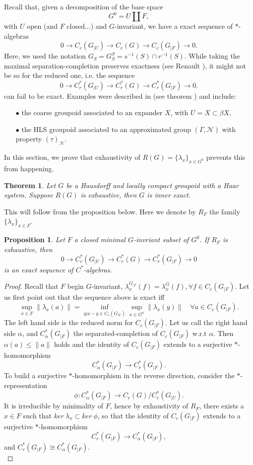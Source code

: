 \documentclass[a4paper]{amsart}
\newcommand\<{\langle}
\renewcommand\>{\rangle}
\newtheorem{thm}{Theorem}[section]
\newtheorem{proposition}[theorem]{Proposition}
\theoremstyle{definition}
\theoremstyle{remark}
\begin{document}
Recall that, given a decomposition of the base space 
\[G^0 = U \coprod F,\]
with $U$ open (and $F$ closed...) and $G$-invariant, we have a exact sequence of $*$-algebras
\[ 0 \rightarrow C_c(G_{|U})\rightarrow  C_c(G)\rightarrow  C_c(G_{|F})\rightarrow 0. \]
Here, we used the notation $G_{S} = G_S^S = s^{-1}(S)\cap r^{-1}(S)$. While taking the maximal separation-completion preserves exactness (see Renault \cite{}), it might not be so for the reduced one, i.e. the sequence 
\[ 0 \rightarrow C_r^*(G_{|U})\rightarrow  C_r^*(G)\rightarrow  C_r^*(G_{|F})\rightarrow 0. \]
can fail to be exact. Examples were described in \cite{DellAieraWillett} (see theorem ) and include:
\begin{itemize}
\item[$\bullet$] the coarse groupoid associated to an expander $X$, with $U=X \subset \beta X$,
\item[$\bullet$] the HLS groupoid associated to an approximated group $(\Gamma,\mathcal N)$ with property $(\tau)_{\mathcal N}$.
\end{itemize}

In this section, we prove that exhaustivity of $R(G)= \{\lambda_x\}_{x\in G^0} $ prevents this from happening.

\begin{thm}
Let $G$ be a Hausdorff and locally compact groupoid with a Haar system. Suppose $R(G)$ is exhaustive, then $G$ is inner exact.
\end{thm}

This will follow from the proposition below. Here we denote by $R_F$ the family $\{ \lambda_x \}_{x\in F}$.
\begin{proposition} Let $F$ a closed minimal $G$-invriant subset of $G^0$.
If $R_F$ is exhaustive, then \[ 0 \rightarrow C_r^*(G_{|U})\rightarrow  C_r^*(G)\rightarrow  C_r^*(G_{|F})\rightarrow 0 \]
is an exact sequence of $C^*$-algebras.
\end{proposition}

\begin{proof}
Recall that $F$ begin $G$-invariant, $\lambda^{G_{|F}}_x (f) =\lambda^G_x(f), \forall f \in C_c(G_{|F})$. Let us first point out that the sequence above is exact iff
\[ \sup_{x\in F} \|\lambda_x(a) \| = \inf_{y | a-y\in C_c(G_{|U})} \sup_{x\in G^0} \| \lambda_x(y)\| \quad \forall a \in C_c(G_{|F}).  \]
The left hand side is the reduced norm for $C_c(G_{|F})$. Let us call the right hand side $\alpha$, and $C^*_\alpha(G_{|F})$ the separated-completion of $C_c(G_{|F})$ w.r.t $\alpha$. Then $\alpha(a) \leq \| a \|$ holds and the identity of $C_c(G_{|F})$ extends to a surjective $*$-homomorphism
\[C^*_\alpha(G_{|F}) \rightarrow C^*_r(G_{|F}).\]
To build a surjective $*$-homomorphism in the reverse direction, consider the $*$-representation 
\[\phi: C_\alpha^*(G_{|F}) \rightarrow C_r(G) / C_r^*(G_{|U}).\]
It is irreducible by minimality of $F$, hence by exhaustivity of $R_F$, there exists a $x\in F$ such that $ker \ \lambda_x \subset ker \ \phi$, so that the identity of $C_c(G_{|F})$ extends to a surjective $*$-homomorphism
\[C^*_r(G_{|F}) \rightarrow C^*_\alpha(G_{|F}),\]
and $C^*_r(G_{|F}) \cong C^*_\alpha(G_{|F})$.\\
\end{proof}
\end{document}
